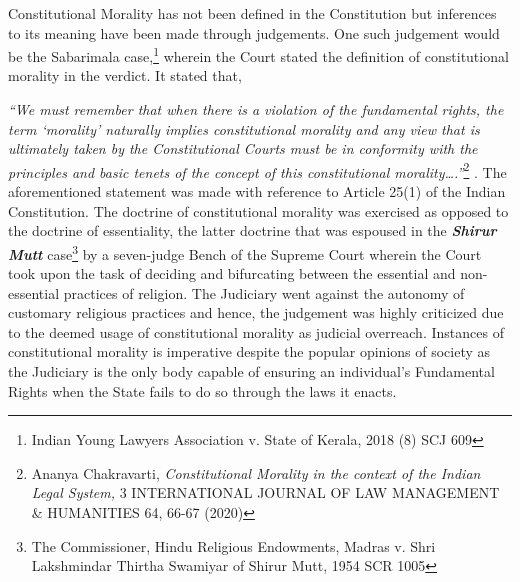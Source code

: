 \setcounter{figure}{0}
\setcounter{table}{0}
\setcounter{footnote}{0}



\begin{multicols}{2}


\noi
Constitutional Morality has not been defined in the Constitution but inferences to its meaning
have been made through judgements. One such judgement would be the Sabarimala case,\footnote{Indian Young Lawyers Association v. State of Kerala, 2018 (8) SCJ 609}
wherein the Court stated the definition of constitutional morality in the verdict. It stated that,

\noi
\textit{“We must remember that when there is a violation of the fundamental rights, the term
‘morality’ naturally implies constitutional morality and any view that is ultimately taken by
the Constitutional Courts must be in conformity with the principles and basic tenets of the
concept of this constitutional morality….”}\footnote{Ananya Chakravarti, \textit{Constitutional Morality in the context of the Indian Legal System,} 3 INTERNATIONAL JOURNAL OF LAW MANAGEMENT \& HUMANITIES 64, 66-67 (2020)}
. The aforementioned statement was made with reference to Article 25(1) of the Indian Constitution. The doctrine of constitutional morality
was exercised as opposed to the doctrine of essentiality, the latter doctrine that was espoused
in the \textbf{\textit{Shirur Mutt}} case\footnote{The Commissioner, Hindu Religious Endowments, Madras v. Shri Lakshmindar Thirtha Swamiyar of Shirur Mutt, 1954 SCR 1005}  by a seven-judge Bench of the Supreme Court wherein the Court
took upon the task of deciding and bifurcating between the essential and non-essential
practices of religion. The Judiciary went against the autonomy of customary religious
practices and hence, the judgement was highly criticized due to the deemed usage of
constitutional morality as judicial overreach. Instances of constitutional morality is
imperative despite the popular opinions of society as the Judiciary is the only body capable of
ensuring an individual’s Fundamental Rights when the State fails to do so through the laws it
enacts.


\end{multicols}
